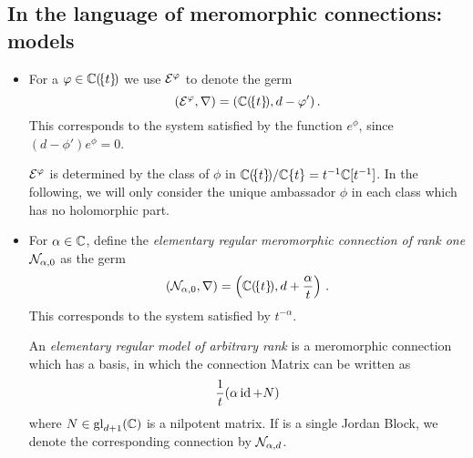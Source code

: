 \subsection{In the language of meromorphic connections: models}
\begin{defn}\label{defn:elemnMerConnBausteine}
  \begin{itemize}
    \item For a $\varphi\in\mathbb{C}(\!\{t\}\!)$ we use $\mathcal{E}^{\varphi}$ to denote the germ
      \[
        (\mathcal{E}^{\varphi},\nabla)=(\mathbb{C}(\!\{t\}\!),d-\varphi')\,.
      \]
      This corresponds to the system satisfied by the function $e^\phi$, since
      $(d-\phi')e^\phi=0$.
      \begin{s-cor}
        $\mathcal{E}^\varphi$ is determined by the class of $\phi$ in
        $\mathbb{C}(\!\{t\}\!)/\mathbb{C}\{t\}=t^{-1}\mathbb{C}[t^{-1}]$. In the following, we will
        only consider the unique ambassador $\phi$ in each class which has no
        holomorphic part.
      \end{s-cor}
    \item For $\alpha\in\mathbb{C}$, define the \emph{elementary regular meromorphic
      connection of rank one} $\mathcal{N}_{\alpha,0}$ as the germ
      \[
        (\mathcal{N}_{\alpha,0},\nabla)=\left(\mathbb{C}(\!\{t\}\!),d+\frac{\alpha}{t}\right)
        \,.
      \]
      This corresponds to the system satisfied by $t^{-\alpha}$.

      An \emph{elementary regular model of arbitrary rank} is a meromorphic
      connection which has a basis, in which the connection Matrix can be
      written as
      \[
        \frac{1}{t} (\alpha\operatorname{id}+N)
      \]
      where $N\in\operatorname{gl}_{d+1}(\mathbb{C})$ is a nilpotent matrix.
      If  is a single Jordan Block, we denote the
      corresponding connection by $\mathcal{N}_{\alpha,d}$.
  \end{itemize}
\end{defn}
